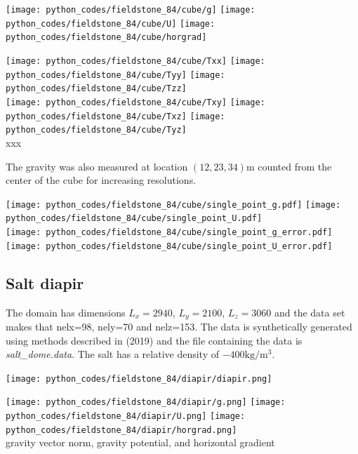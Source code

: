 \begin{center}
\texttt{[image: python\_codes/fieldstone\_84/cube/g]}
\texttt{[image: python\_codes/fieldstone\_84/cube/U]}
\texttt{[image: python\_codes/fieldstone\_84/cube/horgrad]}
\end{center}

\begin{center}
\texttt{[image: python\_codes/fieldstone\_84/cube/Txx]}
\texttt{[image: python\_codes/fieldstone\_84/cube/Tyy]}
\texttt{[image: python\_codes/fieldstone\_84/cube/Tzz]}\\
\texttt{[image: python\_codes/fieldstone\_84/cube/Txy]}
\texttt{[image: python\_codes/fieldstone\_84/cube/Txz]}
\texttt{[image: python\_codes/fieldstone\_84/cube/Tyz]}\\
{\captionfont  xxx}
\end{center}

The gravity was also measured at location $(12,23,34)\si{\metre}$ counted from the center of the cube
for increasing resolutions. 

\begin{center}
\texttt{[image: python\_codes/fieldstone\_84/cube/single\_point\_g.pdf]}
\texttt{[image: python\_codes/fieldstone\_84/cube/single\_point\_U.pdf]}\\
\texttt{[image: python\_codes/fieldstone\_84/cube/single\_point\_g\_error.pdf]}
\texttt{[image: python\_codes/fieldstone\_84/cube/single\_point\_U\_error.pdf]}\\
\end{center}


\newpage
\subsection*{Salt diapir}


The domain has dimensions $L_x=2940$, $L_y=2100$, $L_z=3060$ and the data set makes that  
nelx=98, nely=70 and nelz=153. The data is
synthetically generated using methods described in \textcite{clcc19} (2019)
and the file containing the data is {\sl salt\_dome.data}.
The salt has a relative density of $-400\si{\kg\per\cubic\metre}$.

\begin{center}
\texttt{[image: python\_codes/fieldstone\_84/diapir/diapir.png]}
\end{center}

\begin{center}
\texttt{[image: python\_codes/fieldstone\_84/diapir/g.png]}
\texttt{[image: python\_codes/fieldstone\_84/diapir/U.png]}
\texttt{[image: python\_codes/fieldstone\_84/diapir/horgrad.png]}\\
{\captionfont gravity vector norm, gravity potential, and horizontal gradient}
\end{center}


